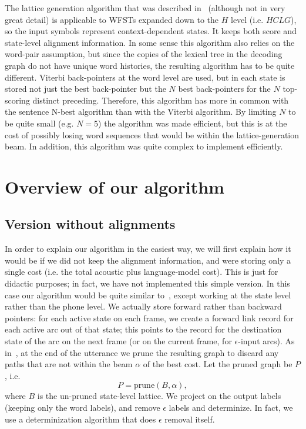 \documentclass{article}
\def\HCLG{{\mathit{HCLG}}}
\begin{document}
The lattice generation algorithm that was described in~\cite{saon2005anatomy} (although not
in very great detail) is applicable to WFSTs expanded down to the $H$ level (i.e. $\HCLG$),
so the input symbols represent context-dependent states.  It keeps both score and 
state-level alignment information.  In some sense this algorithm also relies
on the word-pair assumption, but since the copies of the lexical tree in the decoding
graph do not have unique word histories, the resulting algorithm has to be quite
different.  Viterbi back-pointers at the word level are used, but in each state
is stored not just the best back-pointer but the $N$ best back-pointers for the $N$ top-scoring distinct
preceding.  Therefore, this algorithm has more in common with the sentence N-best
algorithm than with the Viterbi algorithm.  By limiting $N$ to be quite small (e.g. $N{=}5$)
the algorithm was made efficient, but this is at the cost of possibly losing word sequences
that would be within the lattice-generation beam.  In addition, this algorithm was quite
complex to implement efficiently.

\section{Overview of our algorithm}

\subsection{Version without alignments}

In order to explain our algorithm in the easiest way, we will first explain how it would
be if we did not keep the alignment information, and were storing only a single cost
(i.e. the total acoustic plus language-model cost).  This is just for didactic purposes;
in fact, we have not implemented this simple version.
In this case our algorithm would be quite similar
to~\cite{efficient_general}, except working at the state level rather than the phone level.
We actually store forward rather than backward pointers: for each active state on each
frame, we create a forward link record for each active arc out of that state; this points
to the record for the destination state of the arc on the next frame (or on 
the current frame, for $\epsilon$-input
arcs).   As in~\cite{efficient_general}, at the end of the utterance
we prune the resulting graph to discard any paths that are not within the beam $\alpha$ of the best cost. 
Let the pruned graph be $P$, i.e.
\begin{equation}
  P = \mathrm{prune}(B, \alpha),
\end{equation}
where $B$ is the un-pruned state-level lattice.
We project on the output labels (keeping only the word labels), and remove $\epsilon$
labels and determinize.  In fact, we use a determinization algorithm that does $\epsilon$
removal itself.
\end{document}
